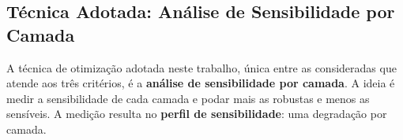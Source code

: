 
\subsection{Técnica Adotada: Análise de Sensibilidade por Camada}

A técnica de otimização adotada neste trabalho, única entre as consideradas que atende aos
três critérios, é a \textbf{análise de sensibilidade por camada}. A ideia é medir a
sensibilidade de cada camada e podar mais as robustas e menos as sensíveis. A medição
resulta no \textbf{perfil de sensibilidade}: uma degradação por camada.


